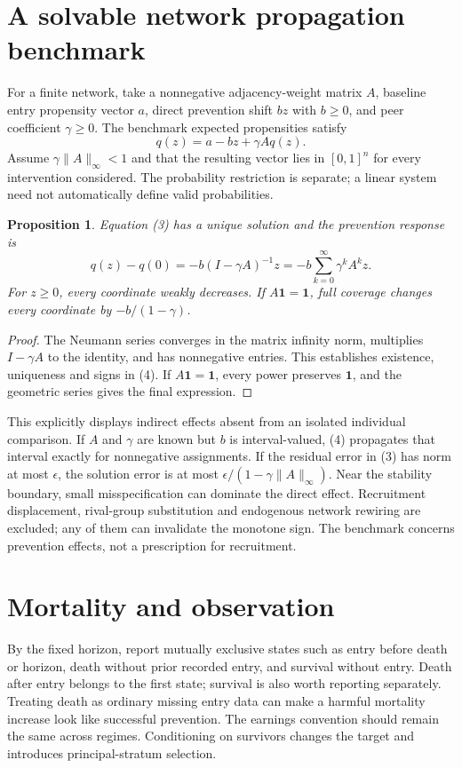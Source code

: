 \documentclass[11pt,a4paper]{article}
\newtheorem{proposition}[theorem]{Proposition}
\begin{document}
\section{A solvable network propagation benchmark}
For a finite network, take a nonnegative adjacency-weight matrix $A$, baseline entry propensity vector $a$, direct prevention shift $bz$ with $b\ge0$, and peer coefficient $\gamma\ge0$. The benchmark expected propensities satisfy
\[
 q(z)=a-bz+\gamma A q(z). \tag{3}
\]
Assume $\gamma\|A\|_\infty<1$ and that the resulting vector lies in $[0,1]^n$ for every intervention considered. The probability restriction is separate; a linear system need not automatically define valid probabilities.
\begin{proposition}
Equation (3) has a unique solution and the prevention response is
\[
 q(z)-q(0)=-b(I-\gamma A)^{-1}z
 =-b\sum_{k=0}^{\infty}\gamma^kA^kz. \tag{4}
\]
For $z\ge0$, every coordinate weakly decreases. If $A\mathbf1=\mathbf1$, full coverage changes every coordinate by $-b/(1-\gamma)$.
\end{proposition}
\begin{proof}
The Neumann series converges in the matrix infinity norm, multiplies $I-\gamma A$ to the identity, and has nonnegative entries. This establishes existence, uniqueness and signs in (4). If $A\mathbf1=\mathbf1$, every power preserves $\mathbf1$, and the geometric series gives the final expression.
\end{proof}
This explicitly displays indirect effects absent from an isolated individual comparison. If $A$ and $\gamma$ are known but $b$ is interval-valued, (4) propagates that interval exactly for nonnegative assignments. If the residual error in (3) has norm at most $\epsilon$, the solution error is at most $\epsilon/(1-\gamma\|A\|_\infty)$. Near the stability boundary, small misspecification can dominate the direct effect. Recruitment displacement, rival-group substitution and endogenous network rewiring are excluded; any of them can invalidate the monotone sign. The benchmark concerns prevention effects, not a prescription for recruitment.

\section{Mortality and observation}
By the fixed horizon, report mutually exclusive states such as entry before death or horizon, death without prior recorded entry, and survival without entry. Death after entry belongs to the first state; survival is also worth reporting separately. Treating death as ordinary missing entry data can make a harmful mortality increase look like successful prevention. The earnings convention should remain the same across regimes. Conditioning on survivors changes the target and introduces principal-stratum selection.
\end{document}
